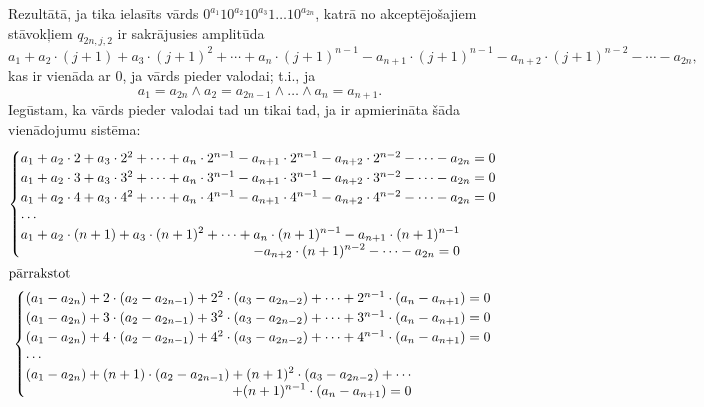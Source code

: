 \documentclass{ludis}
\begin{document}
\begin{pieradijums}
Rezultātā, ja tika ielasīts vārds $0^{a_1}10^{a_2}10^{a_3}1\ldots 10^{a_{2n}}$, katrā no akceptējošajiem stāvokļiem $q_{2n,j,2}$ ir sakrājusies amplitūda
\[
	a_1 + a_2 \cdot (j + 1) + a_3 \cdot (j + 1)^2 + \cdots + a_n \cdot (j + 1)^{n - 1} - a_{n+1} \cdot (j + 1)^{n - 1} - a_{n+2} \cdot (j + 1)^{n - 2} - \cdots - a_{2n},
\]
kas ir vienāda ar $0$, ja vārds pieder valodai; t.i., ja
\[
	a_1 = a_{2n} \wedge a_2 = a_{2n-1} \wedge \ldots \wedge a_n = a_{n+1}.
\]
Iegūstam, ka vārds pieder valodai tad un tikai tad, ja ir apmierināta šāda vienādojumu sistēma:
\begin{gather*}
\allowdisplaybreaks
	\begin{cases}
		a_1 + a_2 \cdot 2 + a_3 \cdot 2^2 + \cdots + a_n \cdot 2^{n - 1} - a_{n+1} \cdot 2^{n - 1} - a_{n+2} \cdot 2^{n - 2} - \cdots - a_{2n} = 0 \\
		a_1 + a_2 \cdot 3 + a_3 \cdot 3^2 + \cdots + a_n \cdot 3^{n - 1} - a_{n+1} \cdot 3^{n - 1} - a_{n+2} \cdot 3^{n - 2} - \cdots - a_{2n} = 0\\
		a_1 + a_2 \cdot 4 + a_3 \cdot 4^2 + \cdots + a_n \cdot 4^{n - 1} - a_{n+1} \cdot 4^{n - 1} - a_{n+2} \cdot 4^{n - 2} - \cdots - a_{2n} = 0\\
		\cdots \\
		\begin{split}
		a_1 + a_2 \cdot (n + 1) + a_3 \cdot (n + 1)^2 + \cdots + a_n \cdot (n + 1)^{n - 1} - a_{n+1} \cdot (n + 1)^{n - 1} \\
		\qquad- a_{n+2} \cdot (n + 1)^{n - 2} - \cdots - a_{2n} = 0\\
		\end{split}
	\end{cases}\\
\intertext{pārrakstot}
	\begin{cases}
		(a_1 - a_{2n}) + 2 \cdot (a_2 - a_{2n-1}) + 2^2 \cdot (a_3 - a_{2n-2}) + \cdots + 2^{n - 1} \cdot (a_n - a_{n+1}) = 0\\
		(a_1 - a_{2n}) + 3 \cdot (a_2 - a_{2n-1}) + 3^2 \cdot (a_3 - a_{2n-2}) + \cdots + 3^{n - 1} \cdot (a_n - a_{n+1}) = 0\\
		(a_1 - a_{2n}) + 4 \cdot (a_2 - a_{2n-1}) + 4^2 \cdot (a_3 - a_{2n-2}) + \cdots + 4^{n - 1} \cdot (a_n - a_{n+1}) = 0\\
		\cdots \\
		\begin{split}
		(a_1 - a_{2n}) + (n + 1) \cdot (a_2 - a_{2n-1}) + (n + 1)^2 \cdot (a_3 - a_{2n-2}) + \cdots \\
		\qquad+ (n + 1)^{n - 1} \cdot (a_n - a_{n+1}) = 0\\
		\end{split}	
	\end{cases}
\end{gather*}


\end{pieradijums}
\end{document}
